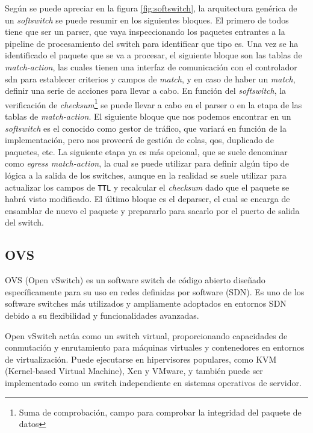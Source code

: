 Según se puede apreciar en la figura \ref*{fig:softswitch}, la arquitectura genérica de un \textit{softswitch} se puede resumir en los siguientes bloques. El primero de todos tiene que ser un parser, que vaya inspeccionando los paquetes entrantes a la pipeline de procesamiento del switch para identificar que tipo es. Una vez se ha identificado el paquete que se va a procesar, el siguiente bloque son las tablas de \textit{match-action}, las cuales tienen una interfaz de comunicación con el controlador \gls{sdn} para establecer criterios y campos de \textit{match}, y en caso de haber un \textit{match}, definir una serie de acciones para llevar a cabo. En función del \textit{softswitch}, la verificación de \textit{checksum}\footnote{Suma de comprobación, campo para comprobar la integridad del paquete de datos} se puede llevar a cabo en el parser o en la etapa de las tablas de \textit{match-action}. El siguiente bloque que nos podemos encontrar en un \textit{softswitch} es el conocido como gestor de tráfico, que variará en función de la implementación, pero nos proveerá de gestión de colas, \gls{qos}, duplicado de paquetes, etc. La siguiente etapa ya es más opcional, que se suele denominar como \textit{egress match-action}, la cual se puede utilizar para definir algún tipo de lógica a la salida de los switches, aunque en la realidad se suele utilizar para actualizar los campos  de \texttt{TTL} y recalcular el \textit{checksum} dado que el paquete se habrá visto modificado. El último bloque es el deparser, el cual se encarga de ensamblar de nuevo el paquete y prepararlo para sacarlo por el puerto de salida del switch.

\subsection{OVS}
\label{subsec:OVS}

OVS (Open vSwitch) es un software switch de código abierto diseñado específicamente para su uso en redes definidas por software (SDN). Es uno de los software switches más utilizados y ampliamente adoptados en entornos SDN debido a su flexibilidad y funcionalidades avanzadas.

Open vSwitch actúa como un switch virtual, proporcionando capacidades de conmutación y enrutamiento para máquinas virtuales y contenedores en entornos de virtualización. Puede ejecutarse en hipervisores populares, como KVM (Kernel-based Virtual Machine), Xen y VMware, y también puede ser implementado como un switch independiente en sistemas operativos de servidor.

